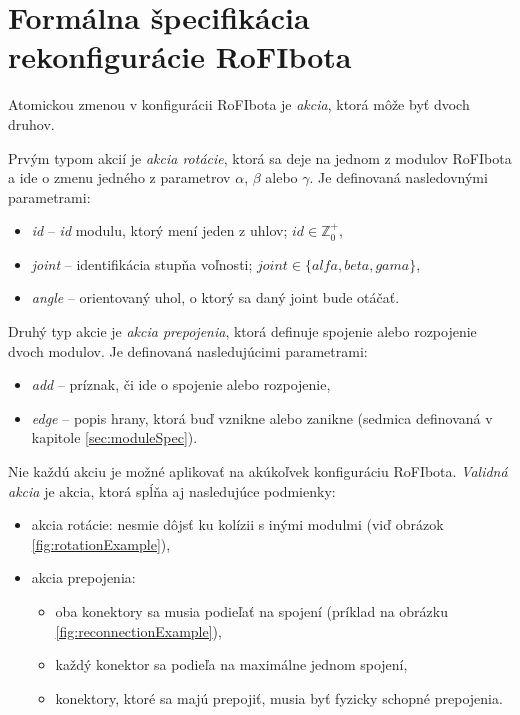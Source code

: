 \documentclass[
  digital, %
  oneside, %
  notable,   %
  lof,     %
  nolot,     %
]{fithesis3}
\begin{document}
\section{Formálna špecifikácia rekonfigurácie RoFIbota}
\label{sec:formalRecfg}
Atomickou zmenou v konfigurácii RoFIbota je \textit{akcia}, ktorá môže byť dvoch druhov. 

Prvým typom akcií je \textit{akcia rotácie}, ktorá sa deje na jednom z modulov RoFIbota a ide o zmenu jedného z parametrov $\alpha$, $\beta$ alebo $\gamma$. Je definovaná nasledovnými parametrami: 
\begin{itemize}
    \item \textit{id} -- \textit{id} modulu, ktorý mení jeden z uhlov; $id \in \mathbb{Z}_0^+$, 
    \item \textit{joint} -- identifikácia stupňa voľnosti; $joint \in \{alfa, beta, gama\}$, 
    \item \textit{angle} -- orientovaný uhol, o ktorý sa daný joint bude otáčať. 
\end{itemize}

Druhý typ akcie je \textit{akcia prepojenia}, ktorá definuje spojenie alebo rozpojenie dvoch modulov. Je definovaná nasledujúcimi parametrami: 
\begin{itemize}
    \item \textit{add} -- príznak, či ide o spojenie alebo rozpojenie,
    \item \textit{edge} -- popis hrany, ktorá buď vznikne alebo zanikne (sedmica definovaná v kapitole \ref{sec:moduleSpec}). 
\end{itemize}

Nie každú akciu je možné aplikovať na akúkoľvek konfiguráciu RoFIbota. \textit{Validná akcia} je akcia, ktorá spĺňa aj nasledujúce podmienky:
\begin{itemize}
    \item akcia rotácie: nesmie dôjsť ku kolízii s inými modulmi (viď obrázok \ref{fig:rotationExample}), 
    \item akcia prepojenia: 
    \begin{itemize}[topsep=-5pt]
        \item oba konektory sa musia podieľať na spojení (príklad na obrázku \ref{fig:reconnectionExample}), 
        \item každý konektor sa podieľa na maximálne jednom spojení,
        \item konektory, ktoré sa majú prepojiť, musia byť fyzicky schopné prepojenia.
    \end{itemize}
\end{itemize}
\end{document}
